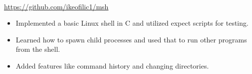 \\
{\url{https://github.com/ikeofilic1/msh}}
\begin{itemize}
    \item Implemented a basic Linux shell in C and utilized expect scripts for testing.
    \item Learned how to spawn child processes and used that to run other programs from the shell.
    \item Added features like command history and changing directories.
\end{itemize}